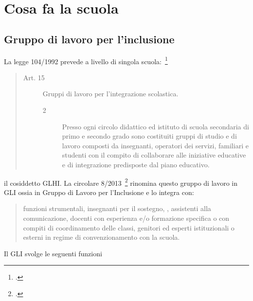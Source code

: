 \chapter{Cosa fa la scuola}
\label{sub:gruppolavoroinclusione}
\section{Gruppo di lavoro per l'inclusione}
La legge 104/1992 prevede a livello di singola scuola:~\footcite[Art. 15 comma 2]{Legge_104_92}
\begin{quote}
	\begin{description}
		\item[Art. 15] Gruppi di lavoro per l'integrazione scolastica. 
		\begin{description}
			\item[2] Presso ogni circolo didattico ed istituto di scuola secondaria di primo e secondo grado sono
			costituiti gruppi di studio e di lavoro composti da insegnanti, operatori dei servizi, familiari e
			studenti con il compito di collaborare alle iniziative educative e di integrazione predisposte dal
			piano educativo.
		\end{description}
	\end{description}
\end{quote}
il cosiddetto GLHI. La circolare 8/2013~\footcite{cm8_2013} rinomina questo gruppo di lavoro in GLI ossia in Gruppo di Lavoro per l'Inclusione e lo integra con: 
\begin{quote}
	funzioni strumentali, insegnanti per il sostegno, , assistenti alla
	comunicazione, docenti  con esperienza e/o formazione specifica o con compiti di
	coordinamento delle classi, genitori ed esperti istituzionali o esterni in regime di
	convenzionamento con la scuola.
\end{quote}
Il GLI svolge le seguenti funzioni 
